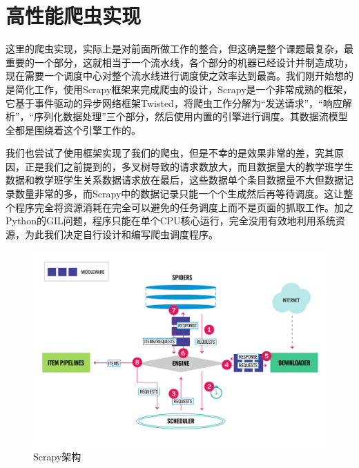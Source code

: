 \documentclass[UTF8, zihao=-4]{ctexart}
\begin{document}
    \section{高性能爬虫实现}
    
    这里的爬虫实现，实际上是对前面所做工作的整合，但这确是整个课题最复杂，最重要的一个部分，这就相当于一个流水线，各个部分的机器已经设计并制造成功，现在需要一个调度中心对整个流水线进行调度使之效率达到最高。我们刚开始想的是简化工作，使用Scrapy框架来完成爬虫的设计，Scrapy是一个非常成熟的框架，它基于事件驱动的异步网络框架Twisted，将爬虫工作分解为“发送请求”，“响应解析”，“序列化数据处理”三个部分，然后使用内置的引擎进行调度。其数据流模型全都是围绕着这个引擎工作的。\cite{scrapy_architecture_overview}\par
    我们也尝试了使用框架实现了我们的爬虫，但是不幸的是效果非常的差，究其原因，正是我们之前提到的，多叉树导致的请求数放大，而且数据量大的教学班学生数据和教学班学生关系数据请求放在最后，这些数据单个条目数据量不大但数据记录数量非常的多，而Scrapy中的数据记录只能一个个生成然后再等待调度。这让整个程序完全将资源消耗在完全可以避免的任务调度上而不是页面的抓取工作。加之Python的GIL问题，程序只能在单个CPU核心运行，完全没用有效地利用系统资源，为此我们决定自行设计和编写爬虫调度程序。\par
    
    \begin{figure}
        \centering
        \includegraphics[width=1.0\linewidth]{figure/scrapy_architecture}
        \caption{Scrapy架构}
        \label{fig:scrapy_architecture}
    \end{figure}
    
\end{document}

